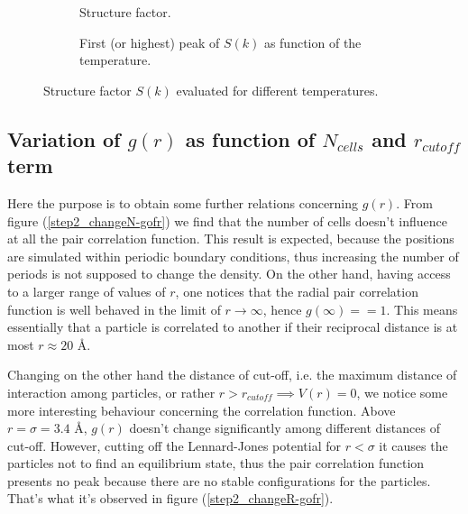 \documentclass[12pt,english]{smfart}
\begin{document}
\begin{figure}
    \begin{subfigure}{0.5\textwidth}
        \resizebox{\textwidth}{!}{
            
        }
        \caption{Structure factor.}
        \label{step2_sk_changeT}
    \end{subfigure}
    \begin{subfigure}{0.5\textwidth}
        \resizebox{\textwidth}{!}{
            
        }
        \caption{First (or highest) peak of $S(k)$ as function of the temperature.}
        \label{step2_sk_changeT_peaks}
    \end{subfigure}
    \caption{Structure factor $S(k)$ evaluated for different temperatures.}
\end{figure}

\subsection{Variation of $g(r)$ as function of $N_{cells}$ and $r_{cutoff}$ term}

Here the purpose is to obtain some further relations concerning $g(r)$. From figure (\ref{step2_changeN-gofr}) we find that the number of cells doesn't influence at all the pair correlation function. This result is expected, because the positions are simulated within periodic boundary conditions, thus increasing the number of periods is not supposed to change the density.  On the other hand, having access to a larger range of values of $r$, one notices that the radial pair correlation function is well behaved in the limit of $r \to \infty$, hence $g(\infty) = = 1$. This means essentially that a particle is correlated to another if their reciprocal distance is at most $r \approx 20$ \si{\angstrom}.

Changing on the other hand the distance of cut-off, i.e. the maximum distance of interaction among particles, or rather $r > r_{cutoff} \implies V(r) = 0$, we notice some more interesting behaviour concerning the correlation function. Above $r = \sigma = 3.4$ \si{\angstrom}, $g(r)$ doesn't change significantly among different distances of cut-off. However, cutting off the Lennard-Jones potential for $r < \sigma$ it causes the particles not to find an equilibrium state, thus the pair correlation function presents no peak because there are no stable configurations for the particles.
That's what it's observed in figure (\ref{step2_changeR-gofr}).
\end{document}
